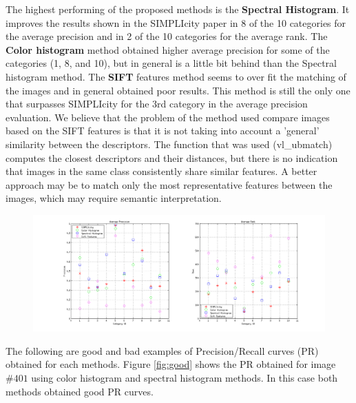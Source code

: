 \documentclass[a4paper,12pt]{article}
\begin{document}
The highest performing of the proposed methods is the \textbf{Spectral Histogram}. It improves the results shown in 
the SIMPLIcity paper in 8 of the 10 categories for the average precision and in 2 
of the 10 categories for the average rank. The \textbf{Color histogram} method obtained
higher average precision for some of the categories (1, 8, and 10), but in general is 
a little bit behind than the Spectral histogram method. The \textbf{SIFT} features 
method seems to over fit the matching of the images and in general obtained poor results. 
This method is still the only one that surpasses SIMPLIcity for the 3rd category in the average precision
evaluation. We believe that the problem of the method used compare images based on the
SIFT features is that it is not taking into account a 'general' similarity between the descriptors. 
The function that was used (vl\_ubmatch) computes the closest descriptors and their distances, but there is no indication that images in the same class consistently share similar features. A better approach may 
be to match only the most representative features between the images, which may require semantic interpretation. 

\begin{figure}[h!]
    \centering
    \includegraphics[totalheight=.26\textheight]{./Images/AllResults.png}
    \label{fig:res}
\end{figure}

The following are good and bad examples of Precision/Recall curves (PR) obtained for each methods. Figure \ref{fig:good} shows the PR obtained for image $\#401$ using 
color histogram and spectral histogram methods. In this case both methods obtained good PR curves. 
\end{document}
